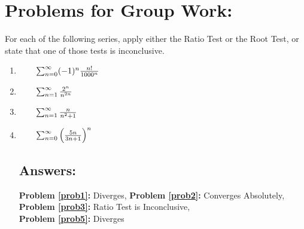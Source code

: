 \documentclass[10pt]{article}
\begin{document}

\pagebreak

\section*{Problems for Group Work:}

For each of the following series, apply either the Ratio Test or the Root Test, or state that one of those tests is inconclusive.


\begin{enumerate}

\item \(\qquad\sum_{n=0}^\infty (-1)^{n}\frac{n!}{1000^n}\) \label{prob1}

\vfill

\item \(\qquad\sum_{n=1}^\infty \frac{2^n}{n^{2n}} \) \label{prob2}

\vfill

\item \(\qquad\sum_{n=1}^\infty \frac{n}{n^2+1}\) \label{prob3}

\vfill

%
%

\item \(\qquad\sum_{n=0}^\infty \left(\frac{5n}{3n+1}\right)^n\) \label{prob5}


\vfill



\subsection*{Answers:}
\textbf{Problem \ref{prob1}:} Diverges, 
\textbf{Problem \ref{prob2}:} Converges Absolutely, 
\textbf{Problem \ref{prob3}:} Ratio Test is Inconclusive, 
\\\textbf{Problem \ref{prob5}:} Diverges




\end{enumerate}
\end{document}
